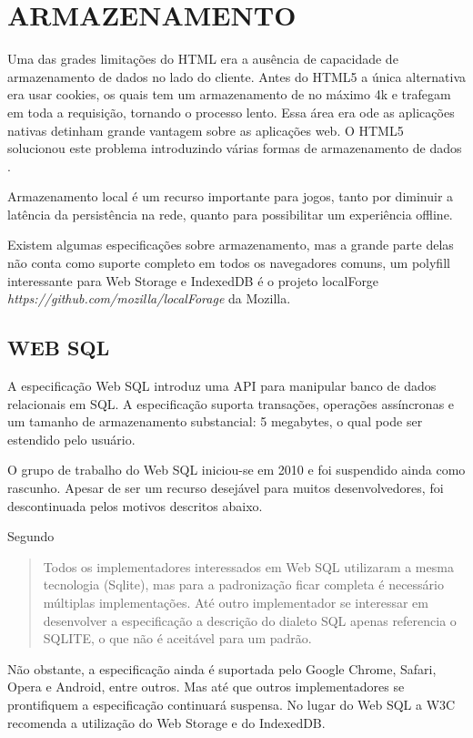 \section{ARMAZENAMENTO}
Uma das grades limitações do HTML era a ausência de capacidade de
armazenamento de dados no lado do cliente. Antes do HTML5 a única
alternativa era usar cookies, os quais tem um armazenamento de no
máximo 4k e trafegam em toda a requisição, tornando o processo lento.
Essa área era ode as aplicações nativas detinham grande vantagem
sobre as aplicações web. O HTML5 solucionou este problema introduzindo
várias formas de armazenamento de dados \autocite{html5Tradeoffs}.

Armazenamento local é um recurso importante para jogos, tanto por
diminuir a latência da persistência na rede, quanto para possibilitar
um experiência offline.

Existem algumas especificações sobre armazenamento, mas a grande
parte delas não conta como suporte completo em todos os navegadores
comuns, um polyfill interessante para Web Storage  e IndexedDB é o
projeto localForge \textit{https://github.com/mozilla/localForage} da
Mozilla.

\subsection{WEB SQL}

A especificação Web SQL introduz uma API para manipular banco de dados
relacionais em SQL. A especificação suporta transações, operações
assíncronas e um tamanho de armazenamento substancial: 5 megabytes, o
qual pode ser estendido pelo usuário.

O grupo de trabalho do Web SQL iniciou-se em 2010 e foi suspendido ainda
como rascunho. Apesar de ser um recurso desejável para muitos
desenvolvedores, foi descontinuada pelos motivos descritos abaixo.

Segundo \cite{diveIntohtml}
\begin{quote}
Todos os implementadores interessados em Web SQL utilizaram a mesma
tecnologia (Sqlite), mas para a padronização ficar completa é
necessário múltiplas implementações. Até outro implementador se
interessar em desenvolver a especificação a descrição do dialeto SQL
apenas referencia o SQLITE, o que não é aceitável para um padrão.
\end{quote}

Não obstante, a especificação ainda é suportada pelo Google
Chrome, Safari, Opera e Android, entre outros. Mas até que outros
implementadores se prontifiquem a especificação continuará suspensa.
No lugar do Web SQL a W3C recomenda a utilização do Web Storage e do
IndexedDB.

